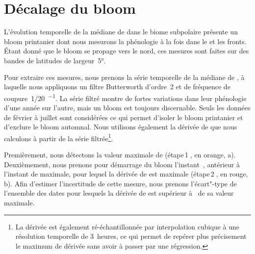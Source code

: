 \section{Décalage du bloom}
\label{sec:decalage-bloom}

L'évolution temporelle de la médiane de  dans le biome subpolaire présente un bloom printanier dont nous mesurons la phénologie  à la fois dans le  et les fronts.
Étant donné que le bloom se propage vers le nord, ces mesures sont faites sur des bandes de latitudes de largeur~\ang[mode=math]{5}.

Pour extraire ces mesures, nous prenons la série temporelle de la médiane de , à laquelle nous appliquons un filtre Butterworth d'ordre~2 et de fréquence de coupure~\qty[parse-numbers=false]{1/20}{\jours^{-1}}.
La série filtré montre de fortes variations dans leur phénologie d'une année sur l'autre, mais un bloom est toujours discernable.
Seuls les données de février à juillet sont considérées ce qui permet d'isoler le bloom printanier et d'exclure le bloom automnal.
Nous utilisons également la dérivée de  que nous calculons à partir de la série filtrée\footnote{%
  La dérivée est également ré-échantillonnée par interpolation cubique à une résolution temporelle de 3~heures, ce qui permet de repérer plus précisement le maximum de dérivée sans avoir à passer par une régression.
}.

Premièrement, nous détectons la valeur maximale de  (étape\,\textcircled{1}, en orange, a).
Deuxièmement, nous prenons pour démarrage du bloom l'instant~, antérieur à l'instant de  maximale, pour lequel la dérivée de  est maximale (étape\,\textcircled{2}, en rouge, b).
Afin d'estimer l'incertitude de cette mesure, nous prenons l'écart"-type de l'ensemble des dates pour lesquels la dérivée de  est supérieur à~ de sa valeur maximale.

\begin{figure}
  \centering
  \label{fig:methode-timing-bloom}
\end{figure}

